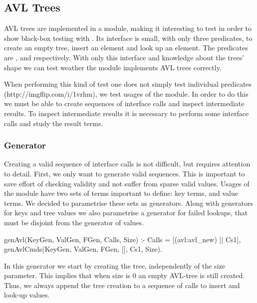 

\subsection{AVL Trees}
AVL trees are implemented in a \Yap{} module, making it interesting to
test in order to show black-box testing with \plqc{}.
%
Its interface is small, with only three predicates, to create an empty
tree, insert an element and look up an element.
%
The predicates are ,  and
 respectively.
%
With only this interface and knowledge about the trees' shape we can
test weather the module implements AVL trees correctly.


When performing this kind of test one does not simply test individual
predicates (http://imgflip.com/i/1vrhm), we test usages of the module.
%
In order to do this we must be able to create sequences of interface
calls and inspect intermediate results.
%
To inspect intermediate results it is necessary to perform some
interface calls and study the result terms.

\subsubsection*{Generator}

Creating a valid sequence of interface calls is not difficult, but
requires attention to detail.
%
First, we only want to generate valid sequences.
%
This is important to save effort of checking validity and not suffer
from sparse valid values.
%
Usages of the module  have two sets of terms important to
define: key terms, and value terms.
%
We decided to parametrise these sets as generators.
%
Along with generators for keys and tree values we also parametrise a
generator for failed lookups, that must be disjoint from the generator
of values.
\begin{yapcode}
 genAvl(KeyGen, ValGen, FGen, Calls, Size) :-
   Calls = [(avl:avl_new) || Cs1],
   genAvlCmds(KeyGen, ValGen, FGen,
              [], Cs1, Size).
\end{yapcode}
%
In this generator we start by creating the tree, independently of the
size parameter.
%
This implies that when size is 0 an empty AVL-tree is still created.
%
Thus, we always append the tree creation to a sequence of calls to insert and look-up
values.


